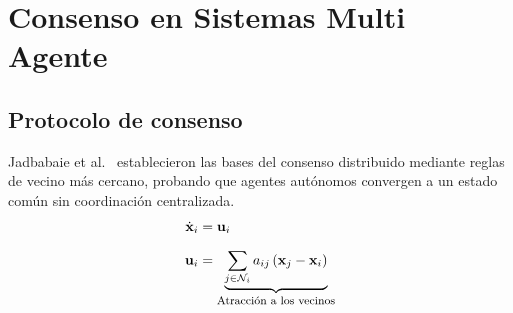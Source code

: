 \section{Consenso en Sistemas Multi Agente}
\onecolumn
\subsection{Protocolo de consenso}
Jadbabaie et al.~\cite{jadbabaie2003} establecieron las bases del consenso distribuido mediante reglas de vecino más cercano, probando que agentes autónomos convergen a un estado común sin coordinación centralizada.
\begin{align*}
    \dot{\mathbf{x}}_i &= \mathbf{u}_i \\[6pt]
    \mathbf{u}_i &=
    \underbrace{\sum_{j \in \mathcal{N}_i} a_{ij}\,(\mathbf{x}_j-\mathbf{x}_i)}_{\text{\footnotesize Atracción a los vecinos}}
\end{align*}

